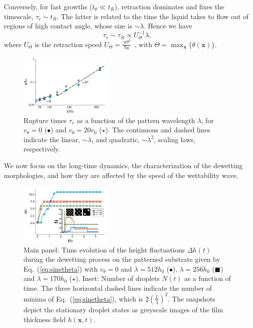 Conversely, for fast growths ($t_{\theta} \ll t_R$), retraction dominates and fixes the timescale, $\tau_r \sim t_R$. 
The latter is related to the time the liquid takes to flow out of regions of high contact angle, whose size is $\sim \lambda$. 
Hence we have 
\begin{equation}\label{eq:taur_l1}
 \tau_r \sim \tau_R \propto U_{\Theta}^{-1}\lambda,
\end{equation}
where $U_{\Theta}$ is the retraction speed $U_{\Theta} = \frac{\gamma \Theta^3}{9\mu}$~\cite{edwardsNotSpreadingReverse2016}, with $\Theta = \max_{\mathbf{x}}\{\theta(\mathbf{x})\}$.
\begin{figure}
    \centering
    \includegraphics[width=0.4\textwidth]{graphics/Figure_2.pdf}
    \caption{Rupture times $\tau_r$ as a function of the pattern wavelength $\lambda$, for $v_{\theta}=0$ (\textcolor{jlblue}{$\bullet$}) and $v_{\theta}=20 v_0$ (\textcolor{jlorange}{$\star$}).
    The continuous and dashed lines indicate the linear, $\sim \lambda$, and quadratic, $\sim \lambda^2$, scaling laws, respectively.
        }
    \label{fig:model_rt}
\end{figure}
We now focus on the long-time dynamics, the characterization of the dewetting morphologies, and how they are affected by the speed of the wettability wave.
\begin{figure}
    \centering
    \includegraphics[width=0.4\textwidth]{graphics/Figure_3.pdf}
    \caption{Main panel: Time evolution of the height fluctuations $\Delta h(t)$ during the dewetting process on the patterned substrate given by Eq.~(\ref{eq:sinetheta}) with $v_{\theta}= 0$ and $\lambda= 512 h_0$ (\textcolor{jlblue}{$\bullet$}), $\lambda=256 h_0$ (\textcolor{jlorange}{$\blacksquare$}) and $\lambda=170 h_0$ (\textcolor{jlgreen}{$\star$}). 
    Inset: Number of droplets $N(t)$ as a function of time. 
    The three horizontal dashed lines indicate the number of minima of Eq.~(\ref{eq:sinetheta}), which is $2\left(\frac{L}{\lambda}\right)^2$. 
    The snapshots depict the stationary droplet states as greyscale images of the film thickness field $h(\mathbf{x},t)$.
      }
    \label{fig:clusters_v0_sine}
\end{figure}

